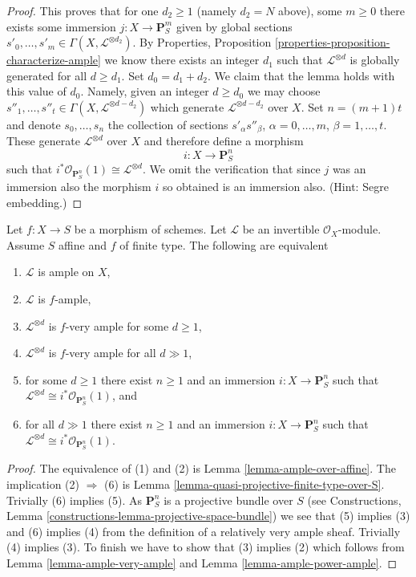 \begin{proof}
\medskip\noindent
This proves that for one $d_2 \geq 1$
(namely $d_2 = N$ above), some $m \geq 0$ there exists some
immersion $j : X \to \mathbf{P}^m_S$ given by global sections
$s'_0, \ldots, s'_m \in \Gamma(X, \mathcal{L}^{\otimes d_2})$.
By Properties, Proposition \ref{properties-proposition-characterize-ample}
we know there exists an integer
$d_1$ such that $\mathcal{L}^{\otimes d}$ is globally generated
for all $d \geq d_1$. Set $d_0 = d_1 + d_2$. We claim that
the lemma holds with this value of $d_0$. Namely, given
an integer $d \geq d_0$ we may choose $s''_1, \ldots, s''_t
\in \Gamma(X, \mathcal{L}^{\otimes d - d_2})$ which generate
$\mathcal{L}^{\otimes d - d_2}$ over $X$. Set $n = (m + 1)t$ and
denote $s_0, \ldots, s_n$ the collection of sections
$s'_\alpha s''_\beta$, $\alpha = 0, \ldots, m$,
$\beta = 1, \ldots, t$. These generate $\mathcal{L}^{\otimes d}$
over $X$ and therefore define a morphism
$$
i : X \longrightarrow \mathbf{P}^n_S
$$
such that $i^*\mathcal{O}_{\mathbf{P}^n_S}(1) \cong \mathcal{L}^{\otimes d}$.
We omit the verification that since $j$ was an immersion
also the morphism $i$ so obtained is an immersion also.
(Hint: Segre embedding.)
\end{proof}

\begin{lemma}
\label{lemma-finite-type-over-affine-ample-very-ample}
Let $f : X \to S$ be a morphism of schemes.
Let $\mathcal{L}$ be an invertible $\mathcal{O}_X$-module.
Assume $S$ affine and $f$ of finite type.
The following are equivalent
\begin{enumerate}
\item $\mathcal{L}$ is ample on $X$,
\item $\mathcal{L}$ is $f$-ample,
\item $\mathcal{L}^{\otimes d}$ is $f$-very ample for some $d \geq 1$,
\item $\mathcal{L}^{\otimes d}$ is $f$-very ample for all $d \gg 1$,
\item for some $d \geq 1$ there exist $n \geq 1$ and an immersion
$i : X \to \mathbf{P}^n_S$ such that
$\mathcal{L}^{\otimes d} \cong i^*\mathcal{O}_{\mathbf{P}^n_S}(1)$, and
\item for all $d \gg 1$ there exist $n \geq 1$ and an immersion
$i : X \to \mathbf{P}^n_S$ such that
$\mathcal{L}^{\otimes d} \cong i^*\mathcal{O}_{\mathbf{P}^n_S}(1)$.
\end{enumerate}
\end{lemma}

\begin{proof}
The equivalence of (1) and (2) is Lemma \ref{lemma-ample-over-affine}.
The implication (2) $\Rightarrow$ (6) is
Lemma \ref{lemma-quasi-projective-finite-type-over-S}.
Trivially (6) implies (5).
As $\mathbf{P}^n_S$ is a projective bundle over $S$ (see
Constructions, Lemma \ref{constructions-lemma-projective-space-bundle})
we see that
(5) implies (3) and (6) implies (4) from the definition of a
relatively very ample sheaf.
Trivially (4) implies (3). To finish we have to show that
(3) implies (2) which follows from Lemma \ref{lemma-ample-very-ample}
and Lemma \ref{lemma-ample-power-ample}.
\end{proof}

